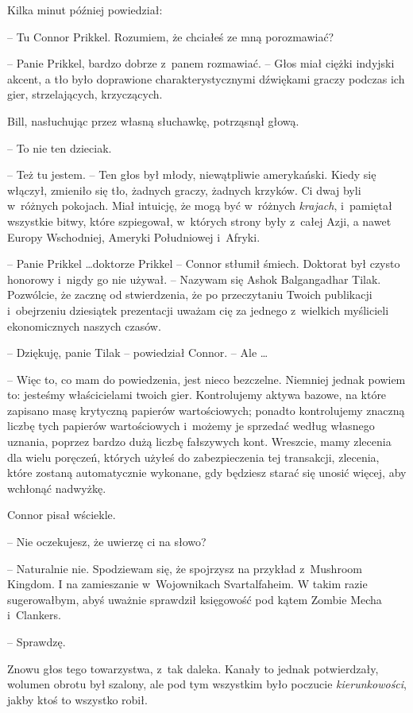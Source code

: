 \documentclass[oneside,polish,11pt,rmheadings]{mwbk}
\begin{document}
Kilka minut później powiedział: 

-- Tu Connor Prikkel. Rozumiem, że chciałeś ze mną porozmawiać?

-- Panie Prikkel, bardzo dobrze z~panem rozmawiać. -- Głos miał ciężki indyjski akcent, a tło było doprawione charakterystycznymi dźwiękami graczy podczas ich gier, strzelających, krzyczących.

Bill, nasłuchując przez własną słuchawkę, potrząsnął głową. 

-- To nie ten dzieciak.

-- Też tu jestem. -- Ten głos był młody, niewątpliwie amerykański. Kiedy się włączył, zmieniło się tło, żadnych graczy, żadnych krzyków. Ci dwaj byli w~różnych pokojach. Miał intuicję, że mogą być w~różnych \textit{krajach}, i~pamiętał wszystkie bitwy, które szpiegował, w~których strony były z~całej Azji, a nawet Europy Wschodniej, Ameryki Południowej i~Afryki.

-- Panie Prikkel \ldots  doktorze Prikkel -- Connor stłumił śmiech. Doktorat był czysto honorowy i~nigdy go nie używał. -- Nazywam się Ashok Balgangadhar Tilak. Pozwólcie, że zacznę od stwierdzenia, że po przeczytaniu Twoich publikacji i~obejrzeniu dziesiątek prezentacji uważam cię za jednego z~wielkich myślicieli ekonomicznych naszych czasów.

-- Dziękuję, panie Tilak -- powiedział Connor. -- Ale  \ldots 

-- Więc to, co mam do powiedzenia, jest nieco bezczelne. Niemniej jednak powiem to: jesteśmy właścicielami twoich gier. Kontrolujemy aktywa bazowe, na które zapisano masę krytyczną papierów wartościowych; ponadto kontrolujemy znaczną liczbę tych papierów wartościowych i~możemy je sprzedać według własnego uznania, poprzez bardzo dużą liczbę fałszywych kont. Wreszcie, mamy zlecenia dla wielu poręczeń, których użyłeś do zabezpieczenia tej transakcji, zlecenia, które zostaną automatycznie wykonane, gdy będziesz starać się unosić więcej, aby wchłonąć nadwyżkę.

Connor pisał wściekle. 

-- Nie oczekujesz, że uwierzę ci na słowo?

-- Naturalnie nie. Spodziewam się, że spojrzysz na przykład z~Mushroom Kingdom. I na zamieszanie w~Wojownikach Svartalfaheim. W takim razie sugerowałbym, abyś uważnie sprawdził księgowość pod kątem Zombie Mecha i~Clankers. 

-- Sprawdzę. 

Znowu głos tego towarzystwa, z~tak daleka. Kanały to jednak potwierdzały, wolumen obrotu był szalony, ale pod tym wszystkim było poczucie \textit{kierunkowości}, jakby ktoś to wszystko robił.
\end{document}
